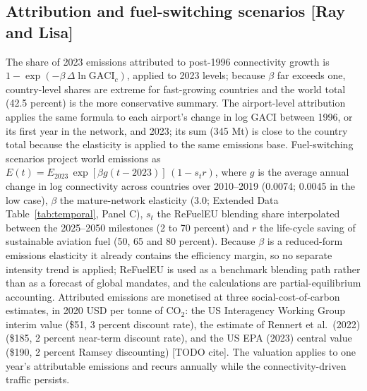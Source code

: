 \documentclass[12pt]{article}
\begin{document}
\subsection*{Attribution and fuel-switching scenarios [Ray and Lisa]}
The share of 2023 emissions attributed to post-1996 connectivity growth is
$1 - \exp(-\beta\,\Delta \ln \mathrm{GACI}_c)$, applied to 2023 levels;
because $\beta$ far exceeds one, country-level shares are extreme for
fast-growing countries and the world total (42.5 percent) is the more
conservative summary. The airport-level attribution applies the same
formula to each airport's change in log GACI between 1996, or its first
year in the network, and 2023; its sum (345 Mt) is close to the country
total because the elasticity is applied to the same emissions base. Fuel-switching scenarios project world emissions as
$E(t) = E_{2023}\,\exp[\beta g (t-2023)]\,(1 - s_t r)$, where $g$ is the
average annual change in log connectivity across countries over
2010--2019 (0.0074; 0.0045 in the low case), $\beta$ the mature-network
elasticity (3.0; Extended Data Table~\ref{tab:temporal}, Panel C), $s_t$
the ReFuelEU blending share interpolated between the 2025--2050 milestones
(2 to 70 percent) and $r$ the life-cycle saving of sustainable aviation
fuel (50, 65 and 80 percent). Because $\beta$ is a reduced-form emissions
elasticity it already contains the efficiency margin, so no separate
intensity trend is applied; ReFuelEU is used as a benchmark blending path
rather than as a forecast of global mandates, and the calculations are
partial-equilibrium accounting. Attributed emissions are monetised at three
social-cost-of-carbon estimates, in 2020 USD per tonne of CO$_2$: the US
Interagency Working Group interim value (\$51, 3 percent discount rate),
the estimate of Rennert et al.\ (2022) (\$185, 2 percent near-term
discount rate), and the US EPA (2023) central value (\$190, 2 percent
Ramsey discounting) [TODO cite]. The valuation applies to one year's
attributable emissions and recurs annually while the connectivity-driven
traffic persists.

\end{document}
